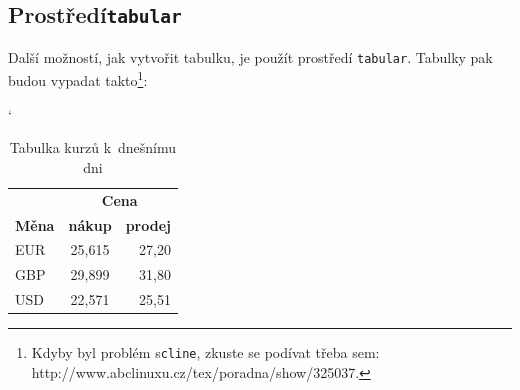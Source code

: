 \documentclass[11pt,a4paper]{article}
\begin{document}
			\subsection{Prostředí\enspace \texttt{tabular}}
			Další možností, jak vytvořit tabulku, je použít prostředí \enspace \verb|tabular|. Tabulky pak budou vypadat takto\footnote{Kdyby byl problém s\enspace \verb|cline|, zkuste se podívat třeba sem:   http://www.abclinuxu.cz/tex/poradna/show/325037.}:
			\vspace{1em}
			\begin{table}[h]
				\catcode` %
				\begin{center}	
					\begin{tabular}{| l | c | r |} \hline

						&\multicolumn{2}{c|}{\textbf{Cena}} \\ \cline{2-3}
						\textbf{Měna} & \textbf{nákup} & \textbf{prodej} \\ \hline
						EUR & 25,615 & 27,20\\
						GBP & 29,899 & 31,80\\
						USD & 22,571 & 25,51 \\ \hline
					\end{tabular}
					\caption{Tabulka kurzů k~dnešnímu dni}
					\label{kurzovylistok}
				\end{center}
			\end{table}
\end{document}

